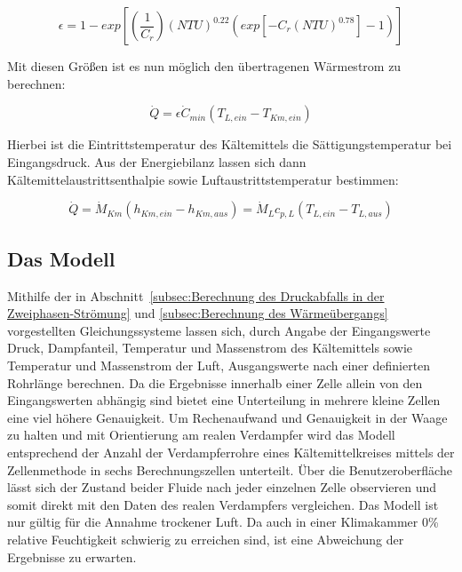 \begin{equation}
\epsilon = 1- exp{\left[\left(\frac{1}{C_r}\right)(NTU)^{0.22}(exp{[-C_r(NTU)^{0.78}]}-1)\right]}
\end{equation}

Mit diesen Größen ist es nun möglich den übertragenen Wärmestrom zu berechnen:

\begin{equation}
\dot{Q} = \epsilon \dot{C}_{min} (T_{L,ein} - T_{Km,ein})
\end{equation}

Hierbei ist die Eintrittstemperatur des Kältemittels die Sättigungstemperatur bei Eingangsdruck. Aus der Energiebilanz lassen sich dann Kältemittelaustrittsenthalpie sowie Luftaustrittstemperatur bestimmen:

\begin{equation}
\dot{Q} = \dot{M}_{Km} (h_{Km,ein} - h_{Km,aus}) = \dot{M}_{L} c_{p,L}(T_{L,ein} - T_{L,aus})
\end{equation}





\subsection{Das Modell}
\label{subsec:Das Modell}

Mithilfe der in Abschnitt~\ref{subsec:Berechnung des Druckabfalls in der Zweiphasen-Strömung} und \ref{subsec:Berechnung des Wärmeübergangs} vorgestellten Gleichungssysteme lassen sich, durch Angabe der Eingangswerte Druck, Dampfanteil, Temperatur und Massenstrom des Kältemittels sowie Temperatur und Massenstrom der Luft, Ausgangswerte nach einer definierten Rohrlänge berechnen. Da die Ergebnisse innerhalb einer Zelle allein von den Eingangswerten abhängig sind bietet eine Unterteilung in mehrere kleine Zellen eine viel höhere Genauigkeit. Um Rechenaufwand und Genauigkeit in der Waage zu halten und mit Orientierung am realen Verdampfer wird das Modell entsprechend der Anzahl der Verdampferrohre eines Kältemittelkreises mittels der Zellenmethode in sechs Berechnungszellen unterteilt\cite{LehrstuhlfurWarmeundStoffubertragung.b}.
Über die Benutzeroberfläche lässt sich der Zustand beider Fluide nach jeder einzelnen Zelle observieren und somit direkt mit den Daten des realen Verdampfers vergleichen.
Das Modell ist nur gültig für die Annahme trockener Luft. Da auch in einer Klimakammer \unit{0}{\%} relative Feuchtigkeit schwierig zu erreichen sind, ist eine Abweichung der Ergebnisse zu erwarten.




